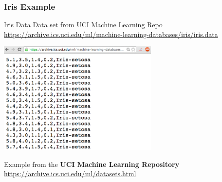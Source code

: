 \documentclass{beamer}\usepackage[]{graphicx}\usepackage[]{color}
\begin{document}

\begin{frame}[fragile]
\frametitle{Iris Example}

\begin{block}{Iris Data}
Data set  from UCI Machine Learning Repo \\
{\scriptsize 
\url{https://archive.ics.uci.edu/ml/machine-learning-databases/iris/iris.data}}

\begin{center}
\includegraphics[width=8cm]{images/iris_data.png}
\end{center}

Example from the \textbf{UCI Machine Learning Repository} \\
{\scriptsize \url{https://archive.ics.uci.edu/ml/datasets.html}}
\end{block}

\end{frame}

\end{document}
